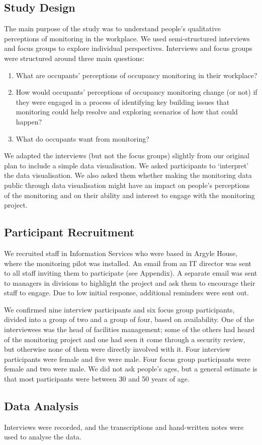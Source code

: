 
\subsection{Study Design}
\label{sec:study-design}

The main purpose of the study was to understand people’s qualitative
perceptions of monitoring in the workplace. We used semi-structured
interviews and focus groups to explore individual perspectives. 
Interviews and focus groups were structured around three main
questions:

\begin{enumerate}
\item What are occupants’ perceptions of occupancy monitoring in their workplace?
\item How would occupants’ perceptions of occupancy monitoring change
  (or not) if they were engaged in a process of identifying key
  building issues that monitoring could help resolve and exploring
  scenarios of how that could happen? 
\item What do occupants want from monitoring?
\end{enumerate}

We adapted the interviews (but not the focus groups) slightly from our
original plan to include a simple data visualisation. We asked
participants to `interpret’ the data visualisation. We also asked them
whether making the monitoring data public through data visualisation
might have an impact on people’s perceptions of the monitoring and on
their ability and interest to engage with the monitoring project.

\subsection{Participant Recruitment}
\label{sec:recruitment}

We recruited staff in Information Services who were based in Argyle
House, where the monitoring pilot was installed. An email from an IT
director was sent to all staff inviting them to participate (see
Appendix). A separate email was sent to managers in divisions to
highlight the project and ask them to encourage their staff to engage.
Due to low initial response, additional reminders were sent out.

We confirmed nine interview participants and six focus group participants,
divided into a group of two and a group of four, based on availability. One
of the interviewees was the head of facilities management; some of the
others had heard of the monitoring project and one had seen it come
through a security review, but otherwise none of them were directly
involved with it. Four interview participants were female and five
were male. Four focus group participants were female and two were
male. We did not ask people’s ages, but a general estimate is that
most participants were between 30 and 50 years of age.

\subsection{Data Analysis}
\label{sec:data-analysis}


Interviews were recorded, and the transcriptions and hand-written
notes were used to analyse the data. 

